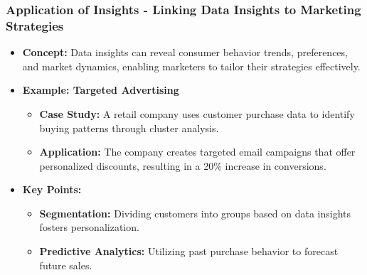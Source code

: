 \documentclass{beamer}
\begin{document}
\begin{frame}[fragile]
    \frametitle{Application of Insights - Linking Data Insights to Marketing Strategies}
    \begin{itemize}
        \item \textbf{Concept:} Data insights can reveal consumer behavior trends, preferences, and market dynamics, enabling marketers to tailor their strategies effectively.
        
        \item \textbf{Example: Targeted Advertising}
            \begin{itemize}
                \item \textbf{Case Study:} A retail company uses customer purchase data to identify buying patterns through cluster analysis.
                \item \textbf{Application:} The company creates targeted email campaigns that offer personalized discounts, resulting in a 20\% increase in conversions.
            \end{itemize}

        \item \textbf{Key Points:}
            \begin{itemize}
                \item \textbf{Segmentation:} Dividing customers into groups based on data insights fosters personalization.
                \item \textbf{Predictive Analytics:} Utilizing past purchase behavior to forecast future sales.
            \end{itemize}
    \end{itemize}
\end{frame}
\end{document}
